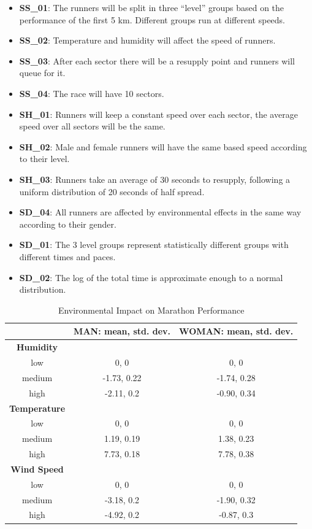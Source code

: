 \documentclass[conference]{IEEEtran}
\begin{document}
\begin{itemize}
    \item \textbf{SS\_01}: The runners will be split in three ``level'' groups based on the performance of the first 5 km. Different groups run at different speeds.
    \item \textbf{SS\_02}: Temperature and humidity will affect the speed of runners.
    \item \textbf{SS\_03}: After each sector there will be a resupply point and runners will queue for it.
    \item \textbf{SS\_04}: The race will have 10 sectors.
    \item \textbf{SH\_01}: Runners will keep a constant speed over each sector, the average speed over all sectors will be the same.
    \item \textbf{SH\_02}: Male and female runners will have the same based speed according to their level.
    \item \textbf{SH\_03}: Runners take an average of 30 seconds to resupply, following a uniform distribution of 20 seconds of half spread.
    \item \textbf{SD\_04}: All runners are affected by environmental effects in the same way according to their gender.
    \item \textbf{SD\_01}: The 3 level groups represent statistically different groups with different times and paces.
    \item \textbf{SD\_02}: The log of the total time is approximate enough to a normal distribution.
\end{itemize}

\begin{table}[htbp]
\caption{Environmental Impact on Marathon Performance}
\begin{center}
\begin{tabular}{|c|c|c|}
\hline
\textbf{} & \textbf{MAN: mean, std. dev.} & \textbf{WOMAN: mean, std. dev.} \\
\hline
\textbf{Humidity} & & \\
\hline
low & 0, 0 & 0, 0 \\
\hline
medium & -1.73, 0.22 & -1.74, 0.28 \\
\hline
high & -2.11, 0.2 & -0.90, 0.34 \\
\hline
\textbf{Temperature} & & \\
\hline
low & 0, 0 & 0, 0 \\
\hline
medium & 1.19, 0.19 & 1.38, 0.23 \\
\hline
high & 7.73, 0.18 & 7.78, 0.38 \\
\hline
\textbf{Wind Speed} & & \\
\hline
low & 0, 0 & 0, 0 \\
\hline
medium & -3.18, 0.2 & -1.90, 0.32 \\
\hline
high & -4.92, 0.2 & -0.87, 0.3 \\
\hline
\end{tabular}
\label{tab:environmental_impact}
\end{center}
\end{table}
\end{document}
